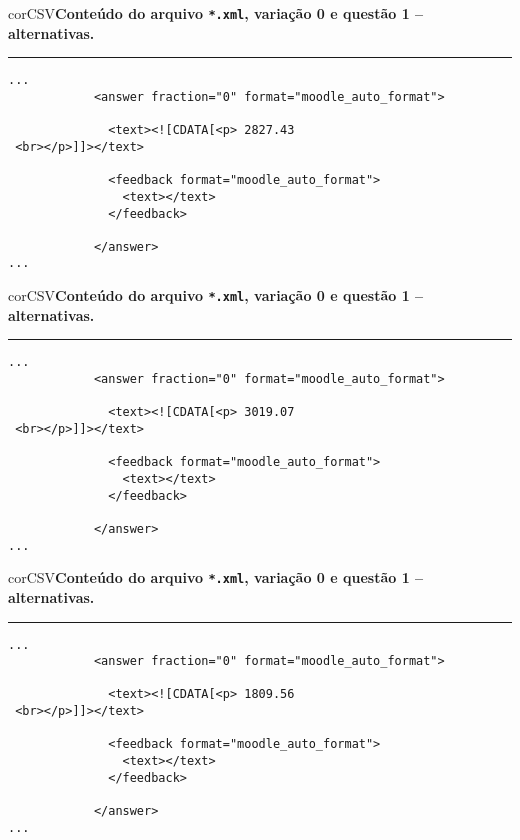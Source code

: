 \begin{myboxCode}{corCSV}{\textbf{Conteúdo do arquivo \texttt{*.xml}, variação 0 e questão 1 -- alternativas.}}\vspace{3mm}
\hrule
{\scriptsize
\begin{verbatim}
...
            <answer fraction="0" format="moodle_auto_format">
            
              <text><![CDATA[<p> 2827.43
 <br></p>]]></text>
            
              <feedback format="moodle_auto_format">
                <text></text>
              </feedback>
              
            </answer>
...
\end{verbatim}
}
\end{myboxCode}

\begin{myboxCode}{corCSV}{\textbf{Conteúdo do arquivo \texttt{*.xml}, variação 0 e questão 1 -- alternativas.}}\vspace{3mm}
\hrule
{\scriptsize
\begin{verbatim}
...
            <answer fraction="0" format="moodle_auto_format">
            
              <text><![CDATA[<p> 3019.07
 <br></p>]]></text>
 
              <feedback format="moodle_auto_format">
                <text></text>
              </feedback>
              
            </answer>
...
\end{verbatim}
}
\end{myboxCode}

\begin{myboxCode}{corCSV}{\textbf{Conteúdo do arquivo \texttt{*.xml}, variação 0 e questão 1 -- alternativas.}}\vspace{3mm}
\hrule
{\scriptsize
\begin{verbatim}
...
            <answer fraction="0" format="moodle_auto_format">
            
              <text><![CDATA[<p> 1809.56
 <br></p>]]></text>
 
              <feedback format="moodle_auto_format">
                <text></text>
              </feedback>
              
            </answer>
...
\end{verbatim}
}
\end{myboxCode}

